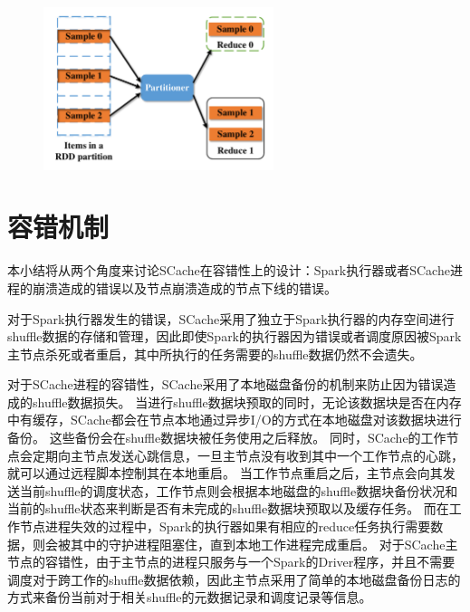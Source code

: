\begin{figure}[!htp]
	\centering
	\includegraphics[width=0.6\textwidth]{../../PPoPP-2018/fig/sample.pdf}
\end{figure}

\section{容错机制}

本小结将从两个角度来讨论SCache在容错性上的设计：Spark执行器或者SCache进程的崩溃造成的错误以及节点崩溃造成的节点下线的错误。

对于Spark执行器发生的错误，SCache采用了独立于Spark执行器的内存空间进行shuffle数据的存储和管理，因此即使Spark的执行器因为错误或者调度原因被Spark主节点杀死或者重启，其中所执行的任务需要的shuffle数据仍然不会遗失。

对于SCache进程的容错性，SCache采用了本地磁盘备份的机制来防止因为错误造成的shuffle数据损失。
当进行shuffle数据块预取的同时，无论该数据块是否在内存中有缓存，SCache都会在节点本地通过异步I/O的方式在本地磁盘对该数据块进行备份。
这些备份会在shuffle数据块被任务使用之后释放。
同时，SCache的工作节点会定期向主节点发送心跳信息，一旦主节点没有收到其中一个工作节点的心跳，就可以通过远程脚本控制其在本地重启。
当工作节点重启之后，主节点会向其发送当前shuffle的调度状态，工作节点则会根据本地磁盘的shuffle数据块备份状况和当前的shuffle状态来判断是否有未完成的shuffle数据块预取以及缓存任务。
而在工作节点进程失效的过程中，Spark的执行器如果有相应的reduce任务执行需要数据，则会被其中的守护进程阻塞住，直到本地工作进程完成重启。
对于SCache主节点的容错性，由于主节点的进程只服务与一个Spark的Driver程序，并且不需要调度对于跨工作的shuffle数据依赖，因此主节点采用了简单的本地磁盘备份日志的方式来备份当前对于相关shuffle的元数据记录和调度记录等信息。

